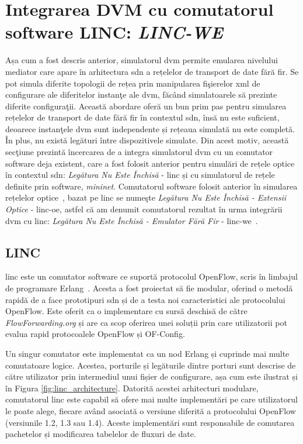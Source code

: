\section{Integrarea DVM cu comutatorul software LINC: \textit{LINC-WE}}

Așa cum a fost descris anterior, simulatorul \gls{dvm} permite emularea nivelului mediator care apare în arhitectura \gls{sdn} a rețelelor de transport de date fără fir. Se pot simula diferite topologii de rețea prin manipularea fişierelor \gls{xml} de configurare ale diferitelor instanţe ale \gls{dvm}, făcând simulatoarele să prezinte diferite configuraţii. Această abordare oferă un bun prim pas pentru simularea rețelelor de transport de date fără fir în contextul \gls{sdn}, însă nu este suficient, deoarece instanţele \gls{dvm} sunt independente și rețeaua simulată nu este completă. În plus, nu există legături între dispozitivele simulate. Din acest motiv, această secţiune prezintă încercarea de a integra simulatorul \gls{dvm} cu un comutator software deja existent, care a fost folosit anterior pentru simulări de rețele optice în contextul \gls{sdn}: \textit{Legătura Nu Este Închisă} - \gls{linc} și cu simulatorul de rețele definite prin software, \textit{mininet}. Comutatorul software folosit anterior în simularea rețelelor optice~\cite{parulkar2015sdn, kretsis2016emulation, mehmeri2017software}, bazat pe \gls{linc} se numeşte \textit{Legătura Nu Este Închisă - Extensii Optice} - \gls{linc-oe}, astfel că am denumit comutatorul rezultat în urma integrării \gls{dvm} cu \gls{linc}: \textit{Legătura Nu Este Închisă - Emulator Fără Fir} - \gls{linc-we}~\cite{stancu2017wireless}.

\subsection{LINC}

\gls{linc} este un comutator software ce suportă protocolul OpenFlow, scris în limbajul de programare Erlang~\cite{lincsw}. Acesta a fost proiectat să fie modular, oferind o metodă rapidă de a face prototipuri \gls{sdn} și de a testa noi caracteristici ale protocolului OpenFlow. Este oferit ca o implementare cu sursă deschisă de către \textit{FlowForwarding.org} și are ca scop oferirea unei soluții prin care utilizatorii pot evalua rapid protocoalele OpenFlow și OF-Config.

Un singur comutator este implementat ca un nod Erlang și cuprinde mai multe comutatoare logice. Acestea, porturile și legăturile dintre porturi sunt descrise de către utilizator prin intermediul unui fișier de configurare, așa cum este ilustrat și în Figura \ref{fig:linc_architecture}. Datorită acestei arhitecturi modulare, comutatorul \gls{linc} este capabil să ofere mai multe implementări pe care utilizatorul le poate alege, fiecare având asociată o versiune diferită a protocolului OpenFlow (versiunile 1.2, 1.3 sau 1.4). Aceste implementări sunt responsabile de comutarea pachetelor și modificarea tabelelor de fluxuri de date.

